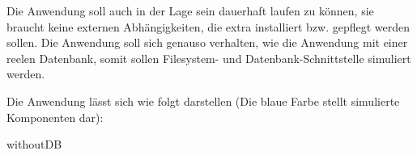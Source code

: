 Die Anwendung soll auch in der Lage sein dauerhaft laufen zu können, 
sie braucht keine externen Abhängigkeiten, die extra installiert bzw. gepflegt werden sollen.
Die Anwendung soll sich genauso verhalten, wie die Anwendung mit einer reelen Datenbank, 
somit sollen Filesystem- und Datenbank-Schnittstelle simuliert werden.

Die Anwendung lässt sich wie folgt darstellen (Die blaue Farbe stellt simulierte Komponenten dar):

{withoutDB}